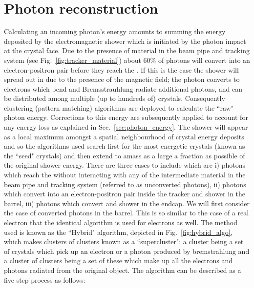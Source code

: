 \section{Photon reconstruction}
\label{sec:photon_reco}
Calculating an incoming photon's energy amounts to summing the energy deposited by the electromagnetic shower which is initiated by the photon impact at the crystal face. Due to the presence of material in the beam pipe and tracking system (see Fig.~\ref{fig:tracker_material}) about 60\% of photons will convert into an electron-positron pair before they reach the \ECAL. If this is the case the shower will spread out in \phi due to the presence of the magnetic field; the photon converts to electrons which bend and Bremsstrauhlung radiate additional photons, and can be distributed among multiple (up to hundreds of) crystals. Consequently clustering (pattern matching) algorithms are deployed to calculate the ``raw" photon energy. Corrections to this energy are subsequently applied to account for any energy loss as explained in Sec.~\ref{sec:photon_energy}. The shower will appear as a local maximum amongst a spatial neighbourhood of crystal energy deposits and so the algorithms used search first for the most energetic crystals (known as the ``seed" crystals) and then extend to amass as a large a fraction as possible of the original shower energy. There are three cases to include which are i) photons which reach the \ECAL without interacting with any of the intermediate material in the beam pipe and tracking system (referred to as unconverted photons), ii) photons which convert into an electron-positron pair inside the tracker and shower in the barrel, iii) photons which convert and shower in the endcap.
We will first consider the case of converted photons in the barrel. This is so similar to the case of a real electron that the identical algorithm is used for electrons as well. The method used is known as the ``Hybrid" algorithm, depicted in Fig.~\ref{fig:hybrid_algo}, which makes clusters of clusters known as a ``supercluster": a cluster being a set of crystals which pick up an electron or a photon produced by bremstrahlung and a cluster of clusters being a set of these which make up all the electrons and photons radiated from the original object. The algorithm can be described as a five step process as follows:
